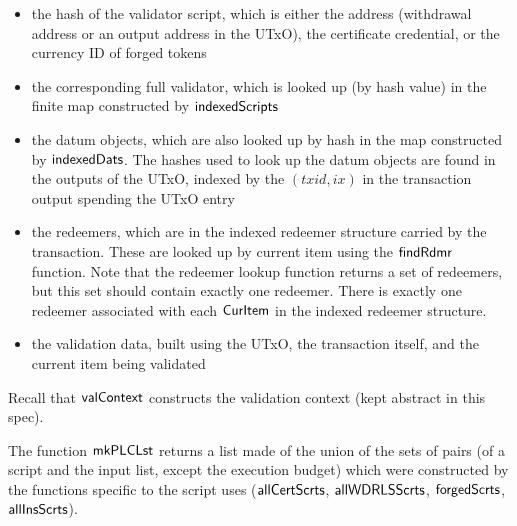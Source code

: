 \begin{itemize}
\item the hash of the validator script, which is either the address (withdrawal
address or an output address in the UTxO),
the certificate credential, or the currency ID of forged tokens

\item the corresponding
full validator, which is looked up (by hash value) in the finite map
constructed by $\mathsf{indexedScripts}$

\item the datum objects, which are also looked up by hash in the map
constructed by $\mathsf{indexedDats}$.
The hashes used to look up the datum objects are found in the outputs of the UTxO,
indexed by the $(txid,ix)$ in the transaction output spending the UTxO entry

\item the redeemers, which are in the indexed redeemer structure carried by the transaction.
These are looked up by current item using the $\mathsf{findRdmr}$ function. Note that
the redeemer lookup function returns a set of redeemers, but this set should
contain exactly one redeemer. There is exactly one redeemer associated with each
$\mathsf{CurItem}$ in the indexed redeemer structure.

\item the validation data, built using the UTxO, the transaction itself,
and the current item being validated
\end{itemize}

Recall that $\mathsf{valContext}$ constructs the validation context (kept abstract
in this spec).

The function $\mathsf{mkPLCLst}$ returns a list made of the union of the sets of
pairs (of a script and the input list, except the execution budget) which were constructed by the
functions specific to the script uses ($\mathsf{allCertScrts}$, $\mathsf{allWDRLSScrts}$,
$\mathsf{forgedScrts}$, $\mathsf{allInsScrts}$).


